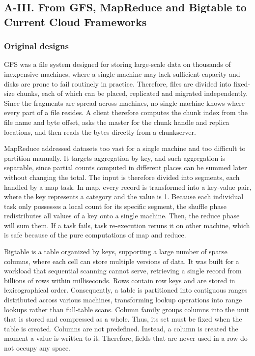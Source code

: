 \subsection{A-III. From GFS, MapReduce and Bigtable to Current Cloud Frameworks}

\subsubsection{Original designs}

GFS was a file system designed for storing large-scale data on thousands of inexpensive machines, where a single machine may lack sufficient capacity and disks are prone to fail routinely in practice. 
Therefore, files are divided into fixed-size chunks, each of which can be placed, replicated and migrated independently.
Since the fragments are spread across machines, no single machine knows where every part of a file resides. 
A client therefore computes the chunk index from the file name and byte offset, 
asks the master for the chunk handle and replica locations, 
and then reads the bytes directly from a chunkserver.

MapReduce addressed datasets too vast for a single machine and too difficult to partition manually.
It targets aggregation by key, and such aggregation is separable, since partial counts computed in different places can be summed later without changing the total. 
The input is therefore divided into segments, each handled by a map task.
In map, every record is transformed into a key-value pair, where the key represents a category and the value is 1. 
Because each individual task only possesses a local count for its specific segment, the shuffle phase redistributes all values of a key onto a single machine.
Then, the reduce phase will sum them.
If a task fails, task re-execution reruns it on other machine, which is safe because of the pure computations of map and reduce.


Bigtable is a table organized by keys, supporting a large number of sparse columns, where each cell can store multiple versions of data. 
It was built for a workload that sequential scanning cannot serve, retrieving a single record from billions of rows within milliseconds.
Rows contain row keys and are stored in lexicographical order. 
Consequently, a table is partitioned into contiguous ranges distributed across various machines, transforming lookup operations into range lookups rather than full-table scans.
Column family groups columns into the unit that is stored and compressed as a whole.
Thus, its set must be fixed when the table is created.
Columns are not predefined. 
Instead, a column is created the moment a value is written to it.
Therefore, fields that are never used in a row do not occupy any space.


